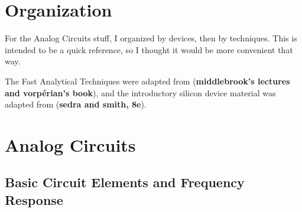 \documentclass[12pt]{report}
\begin{document}

\newpage
\tableofcontents
\newpage
\chapter*{Organization}
For the Analog Circuits stuff, I organized by devices, then by techniques. This is intended to be a quick reference, so I thought it would be more convenient that way.

The Fast Analytical Techniques were adapted from (\textbf{middlebrook's lectures and vorpérian's book}), and the introductory silicon device material was adapted from (\textbf{sedra and smith, 8e}).
\chapter{Analog Circuits} \hr
\section{Basic Circuit Elements and Frequency Response}
\end{document}
